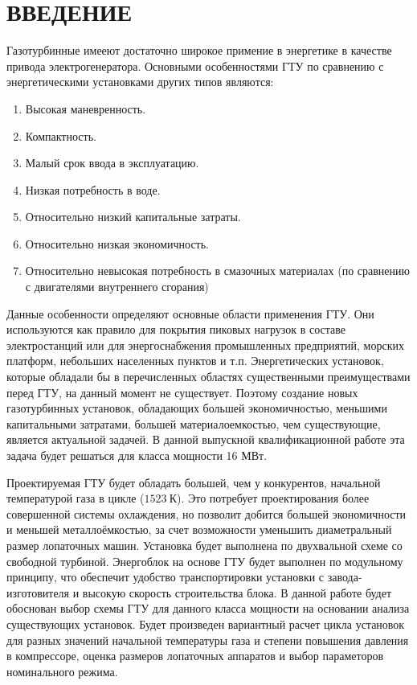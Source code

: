 \documentclass[a4paper,12pt]{article}
\begin{document}
    \section{ВВЕДЕНИЕ}
    Газотурбинные имееют достаточно широкое примение в энергетике в качестве привода электрогенератора.
    Основными особенностями ГТУ по сравнению с энергетическими установками других типов являются:
    \begin{enumerate}
        \item Высокая маневренность.
        \item Компактность.
        \item Малый срок ввода в эксплуатацию.
        \item Низкая потребность в воде.
        \item Относительно низкий капитальные затраты.
        \item Относительно низкая экономичность.
        \item Относительно невысокая потребность в смазочных материалах (по сравнению с двигателями
        внутреннего сгорания)
    \end{enumerate}
    Данные особенности определяют основные области применения ГТУ.
    Они используются как правило для покрытия пиковых нагрузок в составе электростанций или для
    энергоснабжения промышленных предприятий, морских платформ, небольших населенных пунктов и т.п.
    Энергетических установок, которые обладали бы в перечисленных областях существенными преимуществами перед ГТУ, на
    данный момент не существует.
    Поэтому создание новых газотурбинных установок, обладающих большей экономичностью,
    меньшими капитальными затратами, большей материалоемкостью, чем существующие, является актуальной задачей.
    В данной выпускной квалификационной работе эта задача будет решаться для класса мощности 16 МВт.

    Проектируемая ГТУ будет обладать большей, чем у конкурентов, начальной температурой газа в цикле
    ($ 1523\ К $).
    Это потребует проектирования более совершенной системы охлаждения, но позволит добится большей экономичности и
    меньшей металлоёмкостью, за счет возможности уменьшить диаметральный размер лопаточных машин.
    Установка будет выполнена по двухвальной схеме со свободной турбиной.
    Энергоблок на основе ГТУ будет выполнен по модульному принципу, что обеспечит удобство транспортировки установки с
    завода-изготовителя и высокую скорость строительства блока.
    В данной работе будет обоснован выбор схемы ГТУ для данного класса мощности на основании анализа  существующих
    установок.
    Будет произведен вариантный расчет цикла установок для разных значений начальной температуры газа и степени
    повышения давления в компрессоре, оценка размеров лопаточных аппаратов и выбор параметоров номинального режима.
\end{document}

